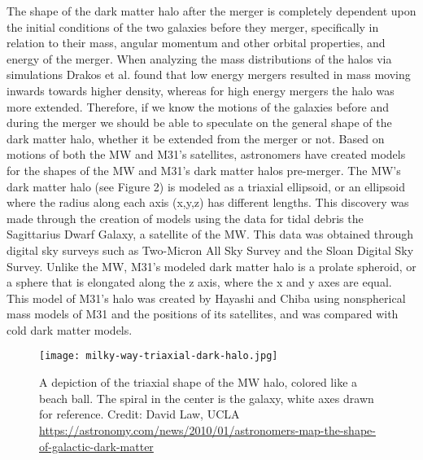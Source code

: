 \documentclass{aastex63}
\begin{document}

The shape of the dark matter halo after the merger is completely dependent upon the initial conditions of the two galaxies before they merger, specifically in relation to their mass, angular momentum and other orbital properties, and energy of the merger. When analyzing the mass distributions of the halos via simulations Drakos et al.\cite{Drakos_2019} found that low energy mergers resulted in mass moving inwards towards higher density, whereas for high energy mergers the halo was more extended. Therefore, if we know the motions of the galaxies before and during the merger we should be able to speculate on the general shape of the dark matter halo, whether it be extended from the merger or not. Based on motions of both the MW and M31’s satellites, astronomers have created models for the shapes of the MW and M31’s dark matter halos pre-merger. The MW’s dark matter halo (see Figure 2) is modeled as a triaxial ellipsoid, or an ellipsoid where the radius along each axis (x,y,z) has different lengths. This discovery was made through the creation of models using the data for tidal debris the Sagittarius Dwarf Galaxy, a satellite of the MW. This data was obtained through digital sky surveys such as Two-Micron All Sky Survey and the Sloan Digital Sky Survey. \cite{Law_2010} Unlike the MW, M31’s modeled dark matter halo is a prolate spheroid, or a sphere that is elongated along the z axis, where the x and y axes are equal. This model of M31’s halo was created by Hayashi and Chiba \cite{Hayashi_2014} using nonspherical mass models of M31 and the positions of its satellites, and was compared with cold dark matter models. 

\begin{figure}[ht!]
\begin{center}
\texttt{[image: milky-way-triaxial-dark-halo.jpg]}
\caption{\label{fig:2} A depiction of the triaxial shape of the MW halo, colored like a beach ball. The spiral in the center is the galaxy, white axes drawn for reference. Credit: David Law, UCLA \url{https://astronomy.com/news/2010/01/astronomers-map-the-shape-of-galactic-dark-matter} }
\end{center}
\end{figure}


\end{document}
